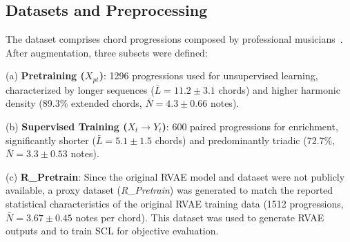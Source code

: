 \documentclass[conference]{IEEEtran}
\begin{document}
\subsection{Datasets and Preprocessing}
\label{sec:datasets}
The dataset comprises chord progressions composed by professional musicians~\cite{rittor2017,rittor2019}. After augmentation, three subsets were defined:

(a) \textbf{Pretraining ($X_{pt}$)}: 1296 progressions used for unsupervised learning, characterized by longer sequences ($\bar{L}=11.2 \pm 3.1$ chords) and higher harmonic density (89.3\% extended chords, $\bar{N}=4.3 \pm 0.66$ notes).

(b) \textbf{Supervised Training ($X_t \rightarrow Y_t$)}: 600 paired progressions for enrichment, significantly shorter ($\bar{L}=5.1 \pm 1.5$ chords) and predominantly triadic (72.7\%, $\bar{N}=3.3 \pm 0.53$ notes).

(c) \textbf{R\_Pretrain}: Since the original RVAE model and dataset were not publicly available, a proxy dataset (\textit{R\_Pretrain}) was generated to match the reported statistical characteristics of the original RVAE training data (1512 progressions, $\bar{N}=3.67 \pm 0.45$ notes per chord). This dataset was used to generate RVAE outputs and to train SCL for objective evaluation.
\end{document}
